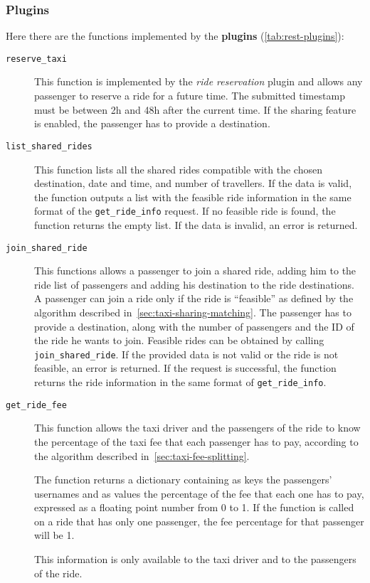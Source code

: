 \subsubsection{Plugins}
Here there are the functions implemented by the \textbf{plugins} (\autoref{tab:rest-plugins}):
\begin{description}
    \item[\texttt{reserve\_taxi}] This function is implemented by the \emph{ride reservation} plugin and allows any passenger to reserve a ride for a future time. The submitted timestamp must be between 2h and 48h after the current time. If the sharing feature is enabled, the passenger has to provide a destination.
    \item[\texttt{list\_shared\_rides}] This function lists all the shared rides compatible with the chosen destination, date and time, and number of travellers. If the data is valid, the function outputs a list with the feasible ride information in the same format of the \texttt{get\_ride\_info} request. If no feasible ride is found, the function returns the empty list. If the data is invalid, an error is returned.
    \item[\texttt{join\_shared\_ride}] This functions allows a passenger to join a shared ride, adding him to the ride list of passengers and adding his destination to the ride destinations. A passenger can join a ride only if the ride is ``feasible'' as defined by the algorithm described in~\autoref{sec:taxi-sharing-matching}. The passenger has to provide a destination, along with the number of passengers and the ID of the ride he wants to join. Feasible rides can be obtained by calling \texttt{join\_shared\_ride}. If the provided data is not valid or the ride is not feasible, an error is returned. If the request is successful, the function returns the ride information in the same format of \texttt{get\_ride\_info}.

    \item[\texttt{get\_ride\_fee}] This function allows the taxi driver and the passengers of the ride to know the percentage of the taxi fee that each passenger has to pay, according to the algorithm described in~\autoref{sec:taxi-fee-splitting}.

    The function returns a dictionary containing as keys the passengers' usernames and as values the percentage of the fee that each one has to pay, expressed as a floating point number from 0 to 1. If the function is called on a ride that has only one passenger, the fee percentage for that passenger will be 1.

    This information is only available to the taxi driver and to the passengers of the ride.
\end{description}

